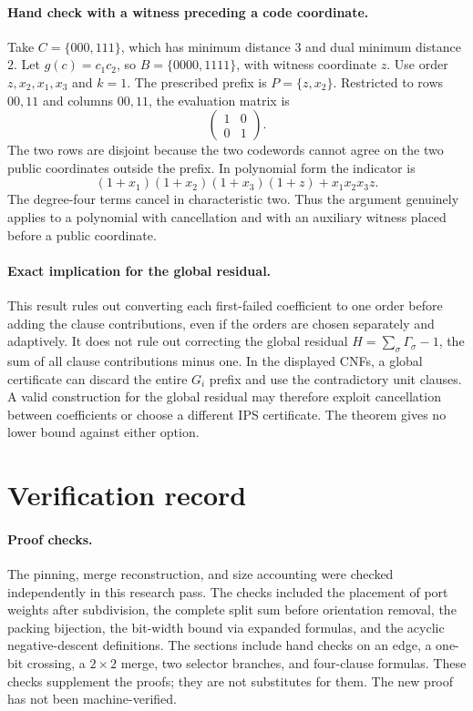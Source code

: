 \documentclass[11pt]{article}
\theoremstyle{definition}
\theoremstyle{remark}
\begin{document}
\paragraph{Hand check with a witness preceding a code coordinate.}
Take $C=\{000,111\}$, which has minimum distance $3$ and dual
minimum distance $2$. Let $g(c)=c_1c_2$, so
$B=\{0000,1111\}$, with witness coordinate $z$. Use order
$z,x_2,x_1,x_3$ and $k=1$. The prescribed prefix is
$P=\{z,x_2\}$. Restricted to rows $00,11$ and columns $00,11$,
the evaluation matrix is
\[
 \begin{pmatrix}1&0\\0&1\end{pmatrix}.
\]
The two rows are disjoint because the two codewords cannot agree
on the two public coordinates outside the prefix. In polynomial
form the indicator is
\[
 (1+x_1)(1+x_2)(1+x_3)(1+z)+x_1x_2x_3z.
\]
The degree-four terms cancel in characteristic two. Thus the
argument genuinely applies to a polynomial with cancellation and
with an auxiliary witness placed before a public coordinate.

\paragraph{Exact implication for the global residual.}
This result rules out converting each first-failed coefficient to
one order before adding the clause contributions, even if the
orders are chosen separately and adaptively. It does not rule out
correcting the global residual
$H=\sum_\sigma\Gamma_\sigma-1$, the sum of all clause contributions
minus one. In the displayed CNFs, a global
certificate can discard the entire $G_i$ prefix and use the
contradictory unit clauses. A valid construction for the global
residual may therefore exploit cancellation between coefficients
or choose a different IPS certificate. The theorem gives no lower
bound against either option.



\section{Verification record}
\label{sec:verification}

\paragraph{Proof checks.}
The pinning, merge reconstruction, and size accounting were
checked independently in this research pass. The checks included
the placement of port weights after subdivision, the complete
split sum before orientation removal, the packing bijection,
the bit-width bound via expanded formulas, and the acyclic
negative-descent definitions. The sections include hand checks
on an edge, a one-bit crossing, a $2\times2$ merge, two selector
branches, and four-clause formulas. These checks supplement
the proofs; they are not substitutes for them. The new proof
has not been machine-verified.
\end{document}
